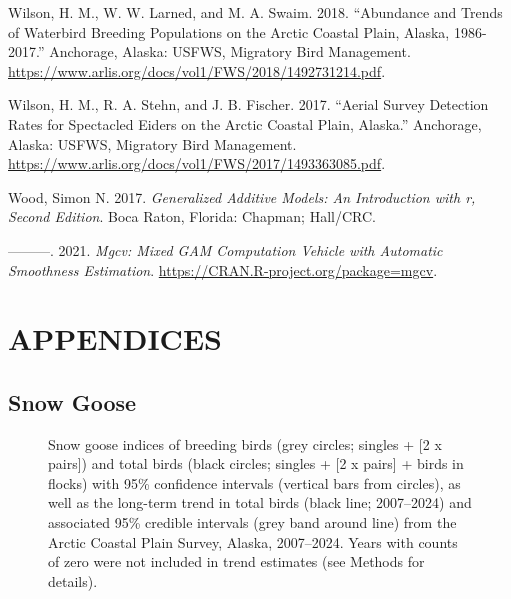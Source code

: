 \documentclass[
]{article}
\newlength{\cslhangindent}
\newenvironment{CSLReferences}[2] %
 {\begin{list}{}{%
  \setlength{\itemindent}{0pt}
  \setlength{\leftmargin}{0pt}
  \setlength{\parsep}{0pt}
  \ifodd #1
   \setlength{\leftmargin}{\cslhangindent}
   \setlength{\itemindent}{-1\cslhangindent}
  \fi
  \setlength{\itemsep}{#2\baselineskip}}}
 {\end{list}}
\begin{document}
\begin{CSLReferences}{1}{0}
Wilson, H. M., W. W. Larned, and M. A. Swaim. 2018. {``Abundance and
Trends of Waterbird Breeding Populations on the Arctic Coastal Plain,
Alaska, 1986-2017.''} Anchorage, Alaska: USFWS, Migratory Bird
Management.
\url{https://www.arlis.org/docs/vol1/FWS/2018/1492731214.pdf}.

Wilson, H. M., R. A. Stehn, and J. B. Fischer. 2017. {``Aerial Survey
Detection Rates for Spectacled Eiders on the Arctic Coastal Plain,
Alaska.''} Anchorage, Alaska: USFWS, Migratory Bird Management.
\url{https://www.arlis.org/docs/vol1/FWS/2017/1493363085.pdf}.

Wood, Simon N. 2017. \emph{Generalized Additive Models: An Introduction
with r, Second Edition}. Boca Raton, Florida: Chapman; Hall/CRC.

---------. 2021. \emph{Mgcv: Mixed GAM Computation Vehicle with
Automatic Smoothness Estimation}.
\url{https://CRAN.R-project.org/package=mgcv}.

\end{CSLReferences}

\newpage{}

\section*{APPENDICES}\label{appendices}

\subsection*{Snow Goose}\label{snow-goose}

\begin{figure}


\caption{\label{fig-SNGO}Snow goose indices of breeding birds (grey
circles; singles + {[}2 x pairs{]}) and total birds (black circles;
singles + {[}2 x pairs{]} + birds in flocks) with 95\% confidence
intervals (vertical bars from circles), as well as the long-term trend
in total birds (black line; 2007--2024) and associated 95\% credible
intervals (grey band around line) from the Arctic Coastal Plain Survey,
Alaska, 2007--2024. Years with counts of zero were not included in trend
estimates (see Methods for details).}

\end{figure}%
\end{document}
